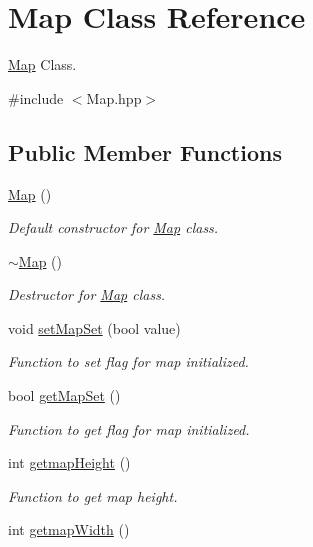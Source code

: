 \hypertarget{classMap}{}\section{Map Class Reference}
\label{classMap}


\hyperlink{classMap}{Map} Class.  




{\ttfamily \#include $<$Map.\+hpp$>$}

\subsection*{Public Member Functions}
\begin{DoxyCompactItemize}
\item 
\hyperlink{classMap_a0f5ad0fd4563497b4214038cbca8b582}{Map} ()
\begin{DoxyCompactList}\small\item\em Default constructor for \hyperlink{classMap}{Map} class. \end{DoxyCompactList}\item 
\hyperlink{classMap_aa403fbe09394ccf39747588f5168e3b2}{$\sim$\+Map} ()
\begin{DoxyCompactList}\small\item\em Destructor for \hyperlink{classMap}{Map} class. \end{DoxyCompactList}\item 
void \hyperlink{classMap_a5d91b013fec2766f7e7092a56829818b}{set\+Map\+Set} (bool value)
\begin{DoxyCompactList}\small\item\em Function to set flag for map initialized. \end{DoxyCompactList}\item 
bool \hyperlink{classMap_a360dfc995ca51cd427f4de531d95db17}{get\+Map\+Set} ()
\begin{DoxyCompactList}\small\item\em Function to get flag for map initialized. \end{DoxyCompactList}\item 
int \hyperlink{classMap_a92dda02fe42250c303e7fcfba73ba89b}{getmap\+Height} ()
\begin{DoxyCompactList}\small\item\em Function to get map height. \end{DoxyCompactList}\item 
int \hyperlink{classMap_a85aa3f85c7c57fffe6bcf6038b1ba288}{getmap\+Width} ()

\end{DoxyCompactItemize}
